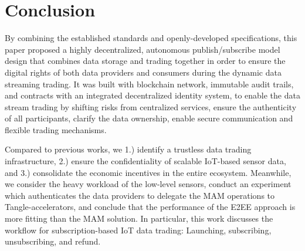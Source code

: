 \documentclass[conference]{IEEEtran}
\begin{document}
\begin{table}[h]
    \caption{Data Price Estimation}
    \label{tab:ether}
    \centering
\end{table}

\section{Conclusion}
\label{section:conclusion}
By combining the established standards and openly-developed specifications, this paper proposed a highly decentralized, autonomous publish/subscribe model design that combines data storage and trading together in order to ensure the digital rights of both data providers and consumers during the dynamic data streaming trading. It was built with blockchain network, immutable audit trails, and contracts with an integrated decentralized identity system, to enable the data stream trading by shifting risks from centralized services, ensure the authenticity of all participants, clarify the data ownership, enable secure communication and flexible trading mechanisms.

Compared to previous works, we 1.) identify a trustless data trading infrastructure, 2.) ensure the confidentiality of scalable IoT-based sensor data, and 3.) consolidate the economic incentives in the entire ecosystem. Meanwhile, we consider the heavy workload of the low-level sensors, conduct an experiment which authenticates the data providers to delegate the MAM operations to Tangle-accelerators, and conclude that the performance of the E2EE approach is more fitting than the MAM solution. In particular, this work discusses the workflow for subscription-based IoT data trading: Launching, subscribing, unsubscribing, and refund.
\end{document}
